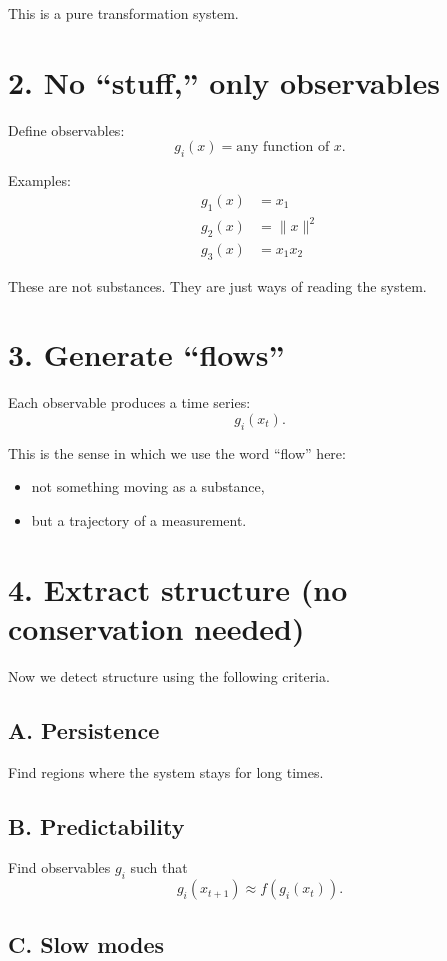 \documentclass[11pt]{article}
\begin{document}
This is a pure transformation system.

\section*{2. No ``stuff,'' only observables}

Define observables:
\[
g_i(x) = \text{any function of } x.
\]

Examples:
\begin{align*}
g_1(x) &= x_1 \\
g_2(x) &= \|x\|^2 \\
g_3(x) &= x_1 x_2
\end{align*}

These are not substances. They are just ways of reading the system.

\section*{3. Generate ``flows''}

Each observable produces a time series:
\[
g_i(x_t).
\]

This is the sense in which we use the word ``flow'' here:
\begin{itemize}[leftmargin=2em]
    \item not something moving as a substance,
    \item but a trajectory of a measurement.
\end{itemize}

\section*{4. Extract structure (no conservation needed)}

Now we detect structure using the following criteria.

\subsection*{A. Persistence}

Find regions where the system stays for long times.

\subsection*{B. Predictability}

Find observables \(g_i\) such that
\[
g_i(x_{t+1}) \approx f(g_i(x_t)).
\]

\subsection*{C. Slow modes}
\end{document}

